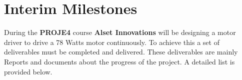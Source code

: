 \section{Interim Milestones}\label{Interim_milestones}


During the \textbf{PROJE4} course \textbf{Alset Innovations} will be designing a motor driver to drive a 78 Watts motor continuously. To achieve this a set of deliverables must be completed and delivered. These deliverables are mainly Reports and documents about the progress of the project. A detailed list is provided below.

